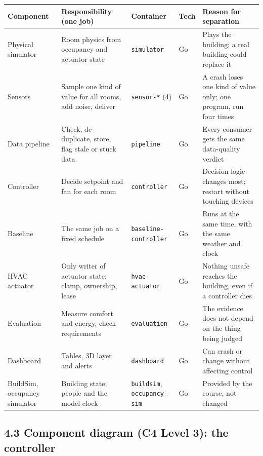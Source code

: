 \documentclass[11pt]{article}
\begin{document}
\begin{longtable}{@{}L{0.15}L{0.26}L{0.19}L{0.08}L{0.32}@{}}
\toprule
\textbf{Component} & \textbf{Responsibility (one job)} & \textbf{Container} & \textbf{Tech} & \textbf{Reason for separation} \\
\midrule
\endhead
\bottomrule
\endlastfoot
Physical simulator & Room physics from occupancy and actuator state & \texttt{simulator} & Go & Plays the building; a real building could replace it \\
Sensors & Sample one kind of value for all rooms, add noise, deliver & \texttt{sensor-*} (4) & Go & A crash loses one kind of value only; one program, run four times \\
Data pipeline & Check, de-duplicate, store, flag stale or stuck data & \texttt{pipeline} & Go & Every consumer gets the same data-quality verdict \\
Controller & Decide setpoint and fan for each room & \texttt{controller} & Go & Decision logic changes most; restart without touching devices \\
Baseline & The same job on a fixed schedule & \texttt{baseline-}\allowbreak\texttt{controller} & Go & Runs at the same time, with the same weather and clock \\
HVAC actuator & Only writer of actuator state: clamp, ownership, lease & \texttt{hvac-actuator} & Go & Nothing unsafe reaches the building, even if a controller dies \\
Evaluation & Measure comfort and energy, check requirements & \texttt{evaluation} & Go & The evidence does not depend on the thing being judged \\
Dashboard & Tables, 3D layer and alerts & \texttt{dashboard} & Go & Can crash or change without affecting control \\
BuildSim, occupancy simulator & Building state; people and the model clock & \texttt{buildsim}, \texttt{occupancy-sim} & Go & Provided by the course, not changed \\
\end{longtable}

\subsection{4.3 Component diagram (C4 Level 3): the controller}

\end{document}
